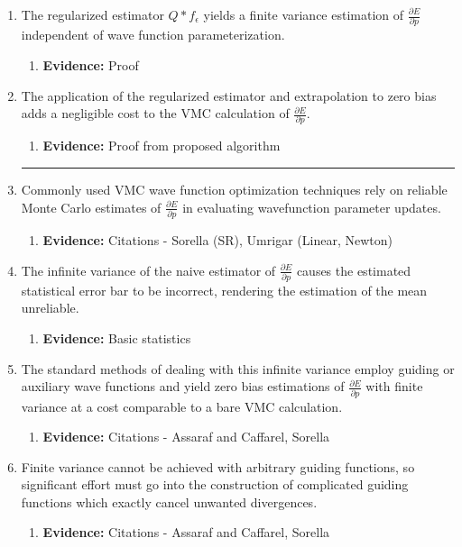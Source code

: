 \documentclass{article}
\begin{document}
\begin{enumerate}
\item The regularized estimator $Q * f_\epsilon$ yields a finite variance estimation of $\frac{\partial E}{\partial p}$ independent of wave function parameterization.
\begin{enumerate}
\item \textbf{Evidence:} Proof
\end{enumerate}

\item The application of the regularized estimator and extrapolation to zero bias adds a negligible cost to the VMC calculation of $\frac{\partial E}{\partial p}$.
\begin{enumerate}
\item \textbf{Evidence:} Proof from proposed algorithm
\end{enumerate}

\noindent\rule{\textwidth}{1pt}
\item Commonly used VMC wave function optimization techniques rely on reliable Monte Carlo estimates of $\frac{\partial E}{\partial p}$ in evaluating wavefunction parameter updates.
\begin{enumerate}
\item \textbf{Evidence:} Citations - Sorella (SR), Umrigar (Linear, Newton)
\end{enumerate}

\item The infinite variance of the naive estimator of $\frac{\partial E}{\partial p}$ causes the estimated statistical error bar to be incorrect, rendering the estimation of the mean unreliable.
\begin{enumerate}
\item \textbf{Evidence:} Basic statistics
\end{enumerate}

\item The standard methods of dealing with this infinite variance employ guiding or auxiliary wave functions and yield zero bias estimations of $\frac{\partial E}{\partial p}$ with finite variance at a cost comparable to a bare VMC calculation.
\begin{enumerate}
\item \textbf{Evidence:} Citations - Assaraf and Caffarel, Sorella
\end{enumerate}

\item Finite variance cannot be achieved with arbitrary guiding functions, so significant effort must go into the construction of complicated guiding functions which exactly cancel unwanted divergences.
\begin{enumerate}
\item \textbf{Evidence:} Citations - Assaraf and Caffarel, Sorella
\end{enumerate}


\end{enumerate}
\end{document}
